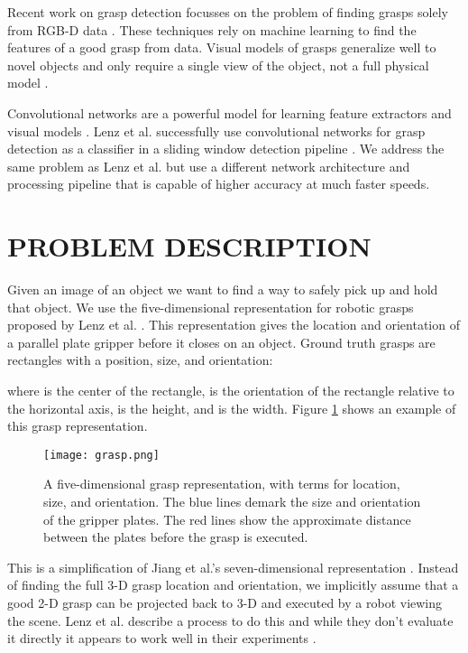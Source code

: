\documentclass[letterpaper, 10 pt, conference]{ieeeconf}
\begin{document}
Recent work on grasp detection focusses on the problem of finding grasps solely from RGB-D data \cite{saxena2008robotic}. These techniques rely on machine learning to find the features of a good grasp from data. Visual models of grasps generalize well to novel objects and only require a single view of the object, not a full physical model \cite{rao2010grasping} \cite{jiang2011efficient}.

Convolutional networks are a powerful model for learning feature extractors and visual models \cite{krizhevsky2012imagenet} \cite{girshick14CVPR}. Lenz et al. successfully use convolutional networks for grasp detection as a classifier in a sliding window detection pipeline \cite{lenz2013deep}. We address the same problem as Lenz et al. but use a different network architecture and processing pipeline that is capable of higher accuracy at much faster speeds.
   
\section{PROBLEM DESCRIPTION}

Given an image of an object we want to find a way to safely pick up and hold that object. We use the five-dimensional representation for robotic grasps proposed by Lenz et al. \cite{lenz2013deep}. This representation gives the location and orientation of a parallel plate gripper before it closes on an object. Ground truth grasps are rectangles with a position, size, and orientation:


where  is the center of the rectangle,  is the orientation of the rectangle relative to the horizontal axis,  is the height, and  is the width. Figure \ref{grasp} shows an example of this grasp representation.

   \begin{figure}[thpb]
      \centering
        \texttt{[image: grasp.png]}
      \caption{A five-dimensional grasp representation, with terms for location, size, and orientation. The blue lines demark the size and orientation of the gripper plates. The red lines show the approximate distance between the plates before the grasp is executed.}
      \label{grasp}
   \end{figure}


This is a simplification of Jiang et al.'s seven-dimensional representation \cite{jiang2011efficient}. Instead of finding the full 3-D grasp location and orientation, we implicitly assume that a good 2-D grasp can be projected back to 3-D and executed by a robot viewing the scene. Lenz et al. describe a process to do this and while they don't evaluate it directly it appears to work well in their experiments \cite{lenz2013deep}.
\end{document}
